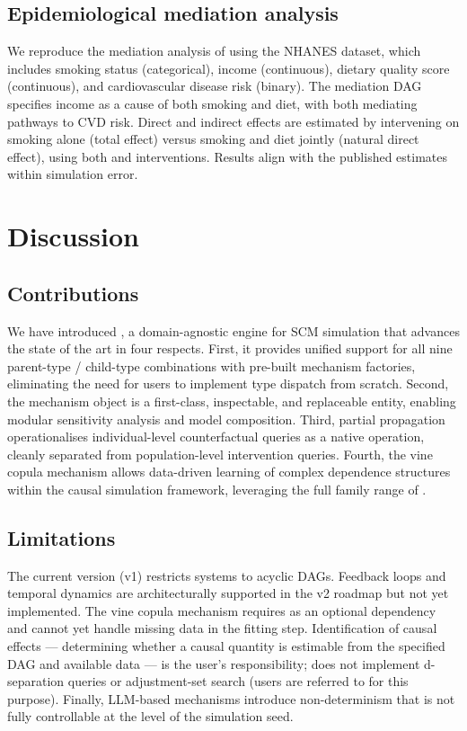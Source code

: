 \documentclass[article]{jss}
\begin{document}
\subsection{Epidemiological mediation analysis}

We reproduce the mediation analysis of \citet{vanderweele2015explanation} using the NHANES dataset, which includes smoking status (categorical), income (continuous), dietary quality score (continuous), and cardiovascular disease risk (binary). The mediation DAG specifies income as a cause of both smoking and diet, with both mediating pathways to CVD risk. Direct and indirect effects are estimated by intervening on smoking alone (total effect) versus smoking and diet jointly (natural direct effect), using both  and  interventions. Results align with the published estimates within simulation error.

\section{Discussion}
\label{sec:discussion}

\subsection{Contributions}

We have introduced , a domain-agnostic engine for SCM simulation that advances the state of the art in four respects. First, it provides unified support for all nine parent-type / child-type combinations with pre-built mechanism factories, eliminating the need for users to implement type dispatch from scratch. Second, the mechanism object is a first-class, inspectable, and replaceable entity, enabling modular sensitivity analysis and model composition. Third, partial propagation operationalises individual-level counterfactual queries as a native operation, cleanly separated from population-level intervention queries. Fourth, the vine copula mechanism allows data-driven learning of complex dependence structures within the causal simulation framework, leveraging the full family range of .

\subsection{Limitations}

The current version (v1) restricts systems to acyclic DAGs. Feedback loops and temporal dynamics are architecturally supported in the v2 roadmap but not yet implemented. The vine copula mechanism requires  as an optional dependency and cannot yet handle missing data in the fitting step. Identification of causal effects --- determining whether a causal quantity is estimable from the specified DAG and available data --- is the user's responsibility;  does not implement d-separation queries or adjustment-set search (users are referred to  for this purpose). Finally, LLM-based mechanisms introduce non-determinism that is not fully controllable at the level of the simulation seed.
\end{document}
